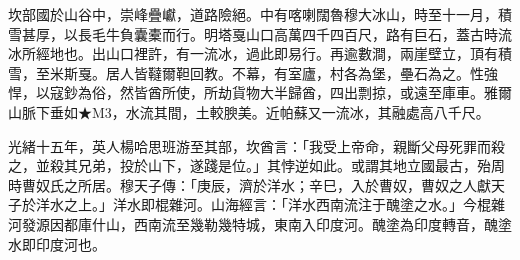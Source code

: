 \begin{pinyinscope}
坎部國於山谷中，崇峰疊巘，道路險絕。中有喀喇闊魯穆大冰山，時至十一月，積雪甚厚，以長毛牛負囊橐而行。明塔戛山口高萬四千四百尺，路有巨石，蓋古時流冰所經地也。出山口裡許，有一流冰，過此即易行。再逾數澗，兩崖壁立，頂有積雪，至米斯戛。居人皆韃爾靼回教。不幕，有室廬，村各為堡，壘石為之。性強悍，以寇鈔為俗，然皆酋所使，所劫貨物大半歸酋，四出剽掠，或遠至庫車。雅爾山脈下垂如★M3，水流其間，土較腴美。近帕蘇又一流冰，其融處高八千尺。

光緒十五年，英人楊哈思班游至其部，坎酋言：「我受上帝命，親斷父母死罪而殺之，並殺其兄弟，投於山下，遂踐是位。」其悖逆如此。或謂其地立國最古，殆周時曹奴氏之所居。穆天子傳：「庚辰，濟於洋水；辛巳，入於曹奴，曹奴之人獻天子於洋水之上。」洋水即棍雜河。山海經言：「洋水西南流注于醜塗之水。」今棍雜河發源因都庫什山，西南流至幾勒幾特城，東南入印度河。醜塗為印度轉音，醜塗水即印度河也。


\end{pinyinscope}